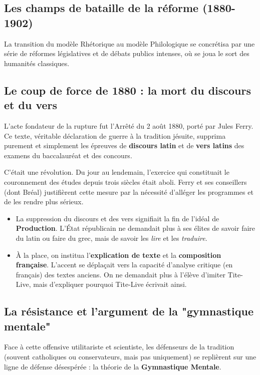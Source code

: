 \subsection{Les champs de bataille de la réforme (1880-1902)}

La transition du modèle Rhétorique au modèle Philologique se concrétisa par une série de réformes
législatives et de débats publics intenses, où se joua le sort des humanités classiques.



\subsection{Le coup de force de 1880 : la mort du discours et du vers}

L'acte fondateur de la rupture fut l'Arrêté du 2 août 1880, porté par Jules Ferry. Ce texte,
véritable déclaration de guerre à la tradition jésuite, supprima purement et simplement les épreuves
de \textbf{discours latin} et de \textbf{vers latins} des examens du baccalauréat et des
concours.\cite{I-1-1-ref9}

C'était une révolution. Du jour au lendemain, l'exercice qui constituait le couronnement des études
depuis trois siècles était aboli. Ferry et ses conseillers (dont Bréal) justifièrent cette mesure
par la nécessité d'\og alléger\fg{} les programmes et de les rendre plus \og sérieux\fg{}.

\begin{itemize}\item La suppression du discours et des vers signifiait la fin de l'idéal de \textbf{Production}. L'État républicain ne demandait plus à ses élites de savoir \og faire du latin\fg{} ou \og faire du grec\fg{}, mais de savoir les \textit{lire} et les \textit{traduire}.\cite{I-1-1-ref10}\item À la place, on institua l'\textbf{explication de texte} et la \textbf{composition française}. L'accent se déplaçait vers la capacité d'analyse critique (en français) des textes anciens. On ne demandait plus à l'élève d'imiter Tite-Live, mais d'expliquer pourquoi Tite-Live écrivait ainsi.\cite{I-1-1-ref9}\end{itemize}

\subsection{La résistance et l'argument de la "gymnastique mentale"}

Face à cette offensive \og utilitariste\fg{} et \og scientiste\fg{}, les défenseurs de la tradition
(souvent catholiques ou conservateurs, mais pas uniquement) se replièrent sur une ligne de défense
désespérée : la théorie de la \textbf{Gymnastique Mentale}.\cite{I-1-1-ref23}

